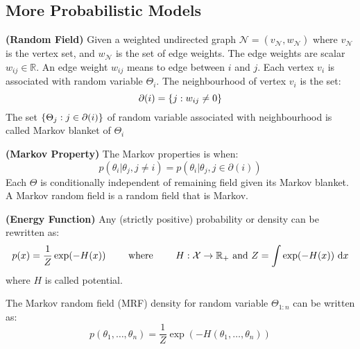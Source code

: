 \subsection{More Probabilistic Models}

\begin{definition}{\textbf{(Random Field)}}
    Given a weighted undirected graph $\mathcal{N} = (v_\mathcal{N}, w_\mathcal{N})$ where $v_\mathcal{N}$ is the vertex set, and $w_\mathcal{N}$ is the set of edge weights. The edge weights are scalar $w_{ij} \in \mathbb{R}$. An edge weight $w_{ij}$ means to edge between $i$ and $j$. Each vertex $v_i$ is associated with random variable $\Theta_i$. The neighbourhood of vertex $v_i$ is the set:
    \begin{equation*}
        \partial (i) = \left\{ j : w_{ij} \ne 0 \right\}
    \end{equation*}
    The set $\left\{ \Theta_j : j \in \partial(i) \right\}$ of random variable associated with neighbourhood is called Markov blanket of $\Theta_i$
\end{definition}

\begin{definition}{\textbf{(Markov Property)}}
    The Markov properties is when:
    \begin{equation*}
        p(\theta_i | \theta_j, j \ne i) = p(\theta_i|\theta_j, j \in \partial (i))
    \end{equation*}
    Each $\Theta$ is conditionally independent of remaining field given its Markov blanket. A Markov random field is a random field that is Markov. 
\end{definition}

\begin{definition}{\textbf{(Energy Function)}}
    Any (strictly positive) probability or density can be rewritten as:
    \begin{equation*}
        p(x) = \frac{1}{Z}\exp(-H(x)) \qquad \text{ where } \qquad H : \mathcal{X}\rightarrow \mathbb{R}_+ \text{ and } Z = \int \exp(-H(x))\ \mathrm{d} x
    \end{equation*}
    where $H$ is called potential.
\end{definition}

\begin{remark}
    The Markov random field (MRF) density for random variable $\Theta_{1:n}$ can be written as:
    \begin{equation*}
        p(\theta_1,\dots,\theta_n) = \frac{1}{Z}\exp(-H(\theta_1,\dots,\theta_n))
    \end{equation*}
\end{remark}

